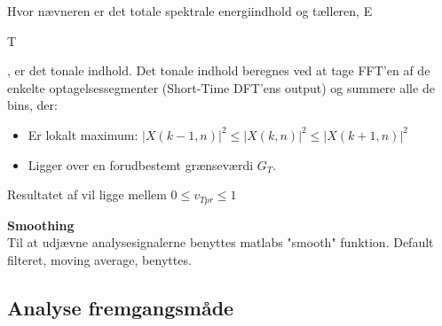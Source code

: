 Hvor nævneren er det totale spektrale energiindhold og tælleren, E\begin{tiny}T\end{tiny}, er det tonale indhold. Det tonale indhold beregnes ved at tage FFT'en af de enkelte optagelsessegmenter (Short-Time DFT'ens output) og summere alle de bins, der:
\begin{itemize}
	\item Er lokalt maximum: ${ \left| X(k-1,n) \right|  }^{ 2 }\le { \left| X(k,n) \right|  }^{ 2 }\le { \left| X(k+1,n) \right|  }^{ 2 }$
	\item Ligger over en forudbestemt grænseværdi ${ G }_{ T }$.
\end{itemize} 	

Resultatet af vil ligge mellem $0\le { v }_{ Tpr }\le 1$

\textbf{Smoothing} \\
Til at udjævne analysesignalerne benyttes matlabs "smooth" funktion. Default filteret, moving average, benyttes.

\newpage
\subsection{Analyse fremgangsmåde}


